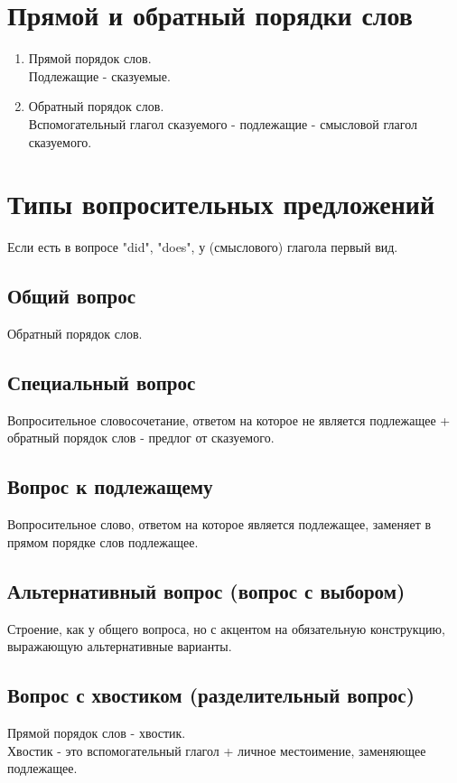\documentclass[oneside]{book}
\begin{document}
    \section{Прямой и обратный порядки слов}
    \begin{enumerate}
        \item Прямой порядок слов. \\
        Подлежащие - сказуемые.

        \item Обратный порядок слов. \\
        Вспомогательный глагол сказуемого - подлежащие - смысловой глагол сказуемого.
    \end{enumerate}

    \section{Типы вопросительных предложений}
    Если есть в вопросе "did"{}, "does"{}, у (смыслового) глагола первый вид.

    \subsection{Общий вопрос}
    Обратный порядок слов.

    \subsection{Специальный вопрос}
    Вопросительное словосочетание, ответом на которое не является подлежащее
    + обратный порядок слов - предлог от сказуемого.

    \subsection{Вопрос к подлежащему}
    Вопросительное слово, ответом на которое является подлежащее,
    заменяет в прямом порядке слов подлежащее.

    \subsection{Альтернативный вопрос (вопрос с выбором)}
    Строение, как у общего вопроса, но с акцентом на обязательную конструкцию,
    выражающую альтернативные варианты.

    \subsection{Вопрос с хвостиком (разделительный вопрос)}
    Прямой порядок слов - хвостик.
    \\
    Хвостик - это вспомогательный глагол + личное местоимение, заменяющее подлежащее.
\end{document}
